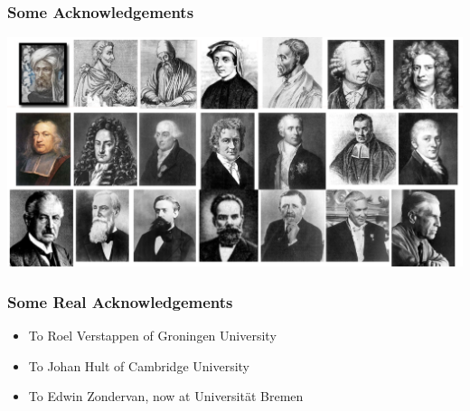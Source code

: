 \documentclass[11pt,table,final,fleqn,xcolor={usenames,dvipsnames},handout]{beamer}
\begin{document}
\begin{frame}
 \frametitle{Some Acknowledgements}
 \centering\includegraphics[width=\textwidth]{img/ack.png}
\end{frame}

\begin{frame}
 \frametitle{Some Real Acknowledgements}
 \begin{itemize}
  \item To Roel Verstappen of Groningen University
  \item To Johan Hult of Cambridge University
  \item To Edwin Zondervan, now at Universit\"at Bremen
 \end{itemize}
\end{frame}
\end{document}
